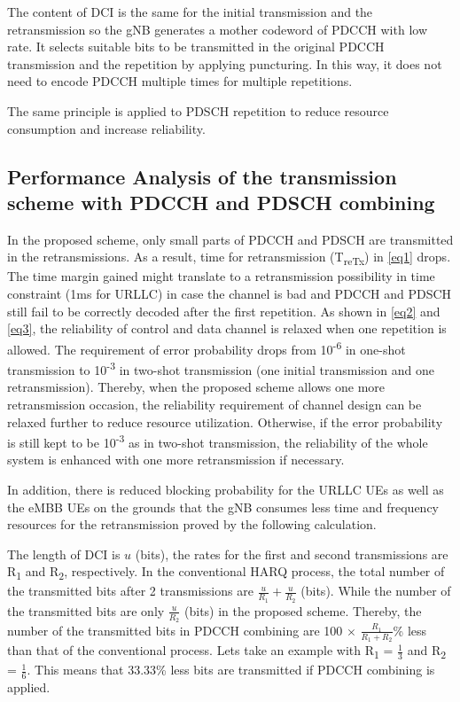 \documentclass[conference]{IEEEtran}
\begin{document}
The content of DCI is the same for the initial transmission and the retransmission so the gNB generates a mother codeword of PDCCH with low rate. It selects suitable bits to be transmitted in the original PDCCH transmission and the repetition by applying puncturing. In this way, it does not need to encode PDCCH multiple times for multiple repetitions. 

The same principle is applied to PDSCH repetition to reduce resource consumption and increase reliability.

\subsection{Performance Analysis of the transmission scheme with PDCCH and PDSCH combining}\label{CC}

In the proposed scheme, only small parts of PDCCH and PDSCH are transmitted in the retransmissions. As a result, time for retransmission (T\textsubscript{reTx}) in \eqref{eq1} drops. The time margin gained might translate to a retransmission possibility in time constraint (1ms for URLLC) in case the channel is bad and PDCCH and PDSCH still fail to be correctly decoded after the first repetition. As shown in \eqref{eq2} and \eqref{eq3}, the reliability of control and data channel is relaxed when one repetition is allowed. The requirement of error probability drops from 10\textsuperscript{-6} in one-shot transmission to 10\textsuperscript{-3} in two-shot transmission (one initial transmission and one retransmission). Thereby, when the proposed scheme allows one more retransmission occasion, the reliability requirement of channel design can be relaxed further to reduce resource utilization. Otherwise, if the error probability is still kept to be 10\textsuperscript{-3} as in two-shot transmission, the reliability of the whole system is enhanced with one more retransmission if necessary. 

In addition, there is reduced blocking probability for the URLLC UEs as well as the eMBB UEs on the grounds that the gNB consumes less time and frequency resources for the retransmission proved by the following calculation. 

The length of DCI is $u$ (bits), the rates for the first and second transmissions are R\textsubscript{1} and R\textsubscript{2}, respectively. In the conventional HARQ process, the total number of the transmitted bits after 2 transmissions are $\frac{u}{R_{1}} + \frac{u}{R_{2}}$ (bits). While the number of the transmitted bits are only $\frac{u}{R_{2}}$ (bits) in the proposed scheme. Thereby, the number of the transmitted bits in PDCCH combining are 100 $\times$ $\frac{R_{1}}{R_{1} + R_{2}}$\% less than that of the conventional process. Let\textquotesingle s take an example with R\textsubscript{1} = $\frac{1}{3}$ and R\textsubscript{2} = $\frac{1}{6}$. This means that 33.33\% less bits are transmitted if PDCCH combining is applied.
\end{document}
